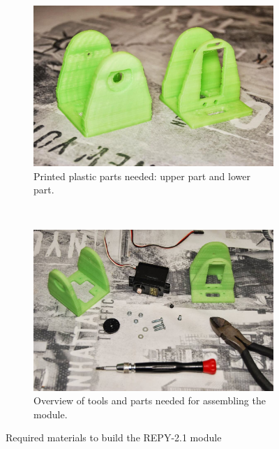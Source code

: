 \begin{figure}[H]
		\centering
        \begin{subfigure}[b]{0.46\textwidth}
                \centering
                \includegraphics[width=\textwidth]{images/REPY2_assembly_01.jpg}
                \caption{Printed plastic parts needed: upper part and lower part.\\}
                \label{fig:hardware_assembly_01}
        \end{subfigure}
        ~
        \begin{subfigure}[b]{0.46\textwidth}
                \centering
                \includegraphics[width=\textwidth]{images/REPY2_assembly_02.jpg}
                \caption{Overview of tools and parts needed for assembling the module.}
                \label{fig:hardware_assembly_02}
        \end{subfigure}
        \caption{Required materials to build the REPY-2.1 module} 
        \label{fig:hardware_assembly_materials}
\end{figure}

